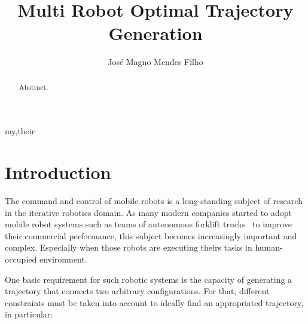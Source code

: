 \documentclass[eprint]{actapoly}
\begin{document}
\title[Trajectory Generation Approach]
{Multi Robot Optimal Trajectory Generation}

\author[J. M. Mendes Filho]{Jos\'{e} Magno Mendes Filho}{my,their}


\begin{abstract}
 Abstract.
\end{abstract}


\maketitle




\section{Introduction}





The command and control of mobile robots is a long-standing subject of research 
in the iterative robotics domain. As many modern companies started to adopt 
mobile robot systems such as teams of autonomous forklift trucks~\cite{Gizmag} 
to improve their commercial performance, this subject becomes increasingly 
important and complex. Especially when those robots are executing theirs tasks 
in human-occupied environment.


One basic requirement for such robotic systems is the capacity of generating a 
trajectory that connects two arbitrary configurations. For that, different 
constraints must be taken into account to ideally find an appropriated 
trajectory, in particular:
\end{document}

